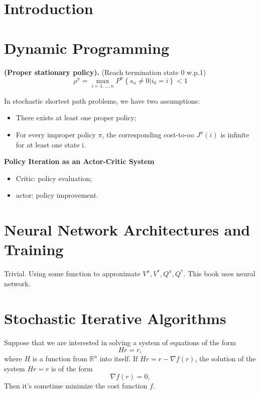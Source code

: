 
\section{Introduction}%

\section{Dynamic Programming}%

\begin{definition}
    \textbf{(Proper stationary policy).} (Reach termination state 0 w.p.1)
    \[
       \rho^{\pi} = \max_{i = 1, \ldots, n} P^{\pi} \left\{ s_n \ne 0 | i_0 = i \right\} < 1
    \]
\end{definition}

In stochastic shortest path problems, we have two assumptions:
\begin{itemize}
    \item There exists at least one proper policy;
    \item For every improper policy $ \pi $, the corresponding cost-to-oo $ J^{\pi}(i) $ is infinite for at least one state i.
\end{itemize}

\textbf{Policy Iteration as an Actor-Critic System}

\begin{itemize}
    \item Critic: policy evaluation;
    \item actor: policy improvement.
\end{itemize}

\section{Neural Network Architectures and Training}%

Trivial. Using some function to approximate $ V^{\pi}, V^{*}, Q^{\pi}, Q^{*} $.
This book uses neural network.

\section{Stochastic Iterative Algorithms}%

Suppose that we are interested in solving a system of equations of the form
\[
    Hr = r,
\]
where $ H $ is a function from $ \mathbb{R}^{n} $ into itself.
If $ Hr = r - \nabla f(r) $, the solution of the system $ Hr = r $ is of the form
\[
    \nabla f(r) = 0,
\]
Then it's sometime minimize the cost function $ f $.


